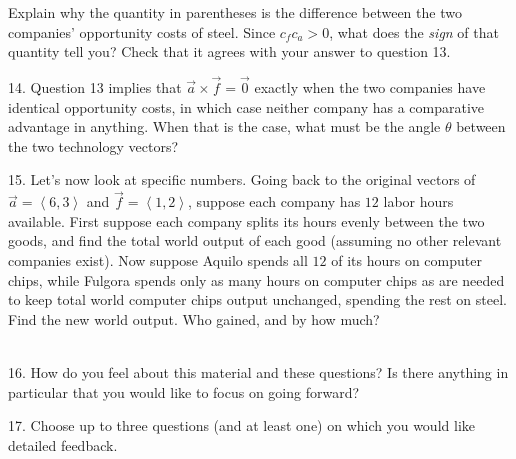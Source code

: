 \documentclass{article}
\begin{document}
Explain why the quantity in parentheses is the difference between the two companies' opportunity costs of steel. Since $c_fc_a > 0$, what does the \textit{sign} of that quantity tell you? Check that it agrees with your answer to question 13.

14. Question 13 implies that $\vec{a} \times \vec{f} = \vec{0}$ exactly when the two companies have identical opportunity costs, in which case neither company has a comparative advantage in anything. When that is the case, what must be the angle $\theta$ between the two technology vectors?

15. Let's now look at specific numbers. Going back to the original vectors of $\vec{a} = \left< 6, 3 \right>$ and $\vec{f} = \left< 1, 2 \right>$, suppose each company has $12$ labor hours available. First suppose each company splits its hours evenly between the two goods, and find the total world output of each good (assuming no other relevant companies exist). Now suppose Aquilo spends all $12$ of its hours on computer chips, while Fulgora spends only as many hours on computer chips as are needed to keep total world computer chips output unchanged, spending the rest on steel. Find the new world output. Who gained, and by how much?

~\\

16. How do you feel about this material and these questions? Is there anything in particular that you would like to focus on going forward?

17. Choose up to three questions (and at least one) on which you would like detailed feedback.
\end{document}
